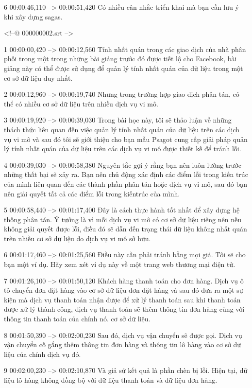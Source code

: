 6
00:00:46,110 --> 00:00:51,420
Có nhiều cân nhắc triển khai mà bạn cần lưu ý khi xây dựng sagas.

<!--@ 000000002.srt -->

1
00:00:00,420 --> 00:00:12,560
Tính nhất quán trong các giao dịch của nhà phân phối trong một trong những bài giảng trước đó được tiết lộ cho Facebook, bài giảng này có thể được sử dụng để quản lý tính nhất quán của dữ liệu trong một cơ sở dữ liệu duy nhất.

2
00:00:12,960 --> 00:00:19,740
Nhưng trong trường hợp giao dịch phân tán, có thể có nhiều cơ sở dữ liệu trên nhiều dịch vụ vi mô.

3
00:00:19,920 --> 00:00:39,030
Trong bài học này, tôi sẽ thảo luận về những thách thức liên quan đến việc quản lý tính nhất quán của dữ liệu trên các dịch vụ vi mô và sau đó tôi sẽ giới thiệu cho bạn mẫu Psagot cung cấp giải pháp quản lý tính nhất quán của dữ liệu trên các dịch vụ vi mô được thiết kế để tránh lỗi.

4
00:00:39,030 --> 00:00:58,380
Nguyên tắc gợi ý rằng bạn nên luôn lường trước những thất bại sẽ xảy ra.  Bạn nên chủ động xác định các điểm lỗi trong kiến ​​trúc của mình liên quan đến các thành phần phân tán hoặc dịch vụ vi mô, sau đó bạn nên giải quyết tất cả các điểm lỗi trong kiến ​​trúc của mình.

5
00:00:58,440 --> 00:01:17,400
Đây là cách thực hành tốt nhất để xây dựng hệ thống phân tán.  Ý tưởng là vì mỗi dịch vụ vi mô có cơ sở dữ liệu riêng nên nếu không giải quyết được lỗi, điều đó sẽ dẫn đến trạng thái dữ liệu không nhất quán trên nhiều cơ sở dữ liệu do dịch vụ vi mô sở hữu.

6
00:01:17,460 --> 00:01:25,560
Điều này cần phải tránh bằng mọi giá.  Tôi sẽ cho bạn một ví dụ.  Hãy xem xét ví dụ này về một trang web thương mại điện tử.

7
00:01:26,100 --> 00:01:50,120
Khách hàng thanh toán cho đơn hàng.  Dịch vụ ô tô chuyển đơn đặt hàng vào cơ sở dữ liệu đơn đặt hàng và sau đó đưa ra một sự kiện mà dịch vụ thanh toán nhận được để xử lý thanh toán sau khi thanh toán được xử lý thành công, dịch vụ thanh toán sẽ thêm thông tin đơn hàng cùng với thông tin thanh toán của chính nó.  cơ sở dữ liệu.

8
00:01:50,390 --> 00:02:00,230
Sau đó, dịch vụ vận chuyển sẽ được gọi.  Dịch vụ vận chuyển cố gắng thêm thông tin đơn hàng và thông tin lô hàng vào cơ sở dữ liệu của chính dịch vụ đó.

9
00:02:00,230 --> 00:02:10,870
Và giả sử kết quả là phần chèn bị lỗi.  Hiện tại, dữ liệu lô hàng không đồng bộ với dữ liệu thanh toán và dữ liệu đơn hàng.

